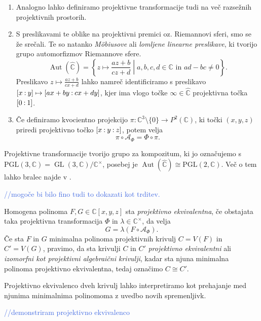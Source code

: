 \documentclass[mat1]{fmfdelo}
\newcommand{\C}{\mathbb C}
\newcommand{\CM}{\mathbb C ^\times}
\newcommand{\PC}{P^2(\mathbb C)}
\newcommand{\RS}{\widehat{\C}}
\newcommand{\Cxyz}{\C[x,y,z]}
\newcommand{\pcoor}[1]{%
  \begingroup\lccode`~=`: \lowercase{\endgroup
  \edef~}{\mathbin{\mathchar\the\mathcode`:}\nobreak}%
  [%
  \begingroup
  \mathcode`:=\string"8000
  #1%
  \endgroup
  ]%
}
\newcommand{\kom}[1]{
    \textcolor{RoyalBlue}{//#1}
}
\DeclareMathOperator{\GL}{GL}
\DeclareMathOperator{\Aut}{Aut}
\theoremstyle{definition}
\begin{document}
\begin{opomba}
    \begin{enumerate}
        \item Analogno lahko definiramo projektivne transformacije tudi na več razsežnih projektivnih prostorih. 
        \item
        S preslikavami te oblike na projektivni premici oz. Riemannovi sferi, smo se že srečali. Te so natanko \emph{Möbiusove} ali \emph{lomljene linearne preslikave}, ki tvorijo grupo automorfizmov Riemannove sfere.
        $$\Aut(\RS) = \left\{ z \mapsto \frac{az + b}{cz +d} \middle\vert a,b,c,d \in \C \text{ in }  ad - bc \neq 0 \right\}.$$
        Preslikavo $z \mapsto \tfrac{az + b}{cx +d}$ lahko namreč identificiramo s preslikavo $\pcoor{x:y} \mapsto \pcoor{ax + by: cx + dy}$, kjer ima vlogo točke $\infty \in \RS$ projektivna točka $\pcoor{0:1}$. 
        \item
        Če definiramo kvocientno projekcijo $\pi : \C^3 \setminus \{0\} \to \PC$, ki točki $(x,y,z)$ priredi projektivno točko $\pcoor{x:y:z}$, potem velja 
        $$\pi \circ \mathcal{A}_\Phi = \Phi \circ \pi.$$
    \end{enumerate}
\end{opomba}

Projektivne transformacije tvorijo grupo za kompozitum, ki jo označujemo s $\operatorname{PGL(3, \C)} = \GL(3,\C)/\CM$, posebej je $\Aut(\RS) \cong \operatorname{PGL(2,\C)}$. Več o tem lahko bralec najde v \cite[poglavje 11]{Gibson}.
\kom{mogoče bi bilo fino tudi to dokazati kot trditev.}

\begin{definicija}
    Homogena polinoma $F,G \in \Cxyz$ sta \emph{projektivno ekvivalentna}, če obstajata taka projektivna transformacija $\Phi$ in $\lambda \in \CM$, da velja
    $$ G = \lambda (F \circ \mathcal{A}_\Phi). $$
    Če sta $F$ in $G$ minimalna polinoma projektivnih krivulj $C = V(F)$ in $C' = V(G)$, pravimo, da sta krivulji $C$ in $C'$ \emph{projektivno ekvivalentni} ali \emph{izomorfni kot projektivni algebraični krivulji}, kadar sta njuna minimalna polinoma projektivno ekvivalentna, tedaj označimo $C \cong C'$. 
\end{definicija}

Projektivno ekvivalenco dveh krivulj lahko interpretiramo kot prehajanje med njunima minimalnima polinomoma z uvedbo novih spremenljivk.

\begin{primer*}
    \kom{demonstriram projektivno ekvivalenco}
\end{primer*}
\end{document}
